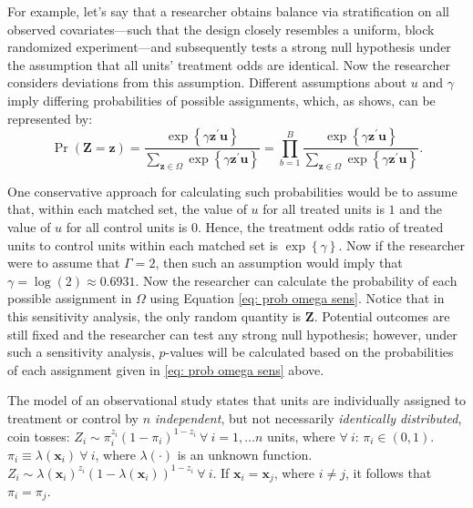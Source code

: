 \documentclass[12pt,leqno]{article}
\theoremstyle{newstyle}
\begin{document}
For example, let's say that a researcher obtains balance via stratification on all observed covariates---such that the design closely resembles a uniform, block randomized experiment---and subsequently tests a strong null hypothesis under the assumption that all units' treatment odds are identical. Now the researcher considers deviations from this assumption. Different assumptions about $u$ and $\gamma$ imply differing probabilities of possible assignments, which, as \citet[Chapter 4]{rosenbaum2002observational} shows, can be represented by:
\begin{equation}
\Pr\left(\mathbf{Z} = \mathbf{z}\right) = \frac{\exp\left\{\gamma \mathbf{z}^{\prime}\mathbf{u}\right\}}{\sum_{\mathbf{z} \in \Omega} \exp\left\{\gamma \mathbf{z}^{\prime}\mathbf{u}\right\}} = \prod \limits_{b = 1}^B \frac{\exp\left\{\gamma \mathbf{z}^{\prime}\mathbf{u}\right\}}{\sum_{\mathbf{z} \in \Omega} \exp\left\{\gamma \mathbf{z}^{\prime}\mathbf{u}\right\}}.
\label{eq: prob omega sens}
\end{equation}

One conservative approach for calculating such probabilities would be to assume that, within each matched set, the value of $u$ for all treated units is $1$ and the value of $u$ for all control units is $0$. Hence, the treatment odds ratio of treated units to control units within each matched set is $\exp\left\{\gamma\right\}$. Now if the researcher were to assume that $\Gamma = 2$, then such an assumption would imply that $\gamma = \log\left(2\right) \approx 0.6931$. Now the researcher can calculate the probability of each possible assignment in $\Omega$ using Equation \ref{eq: prob omega sens}. Notice that in this sensitivity analysis, the only random quantity is $\mathbf{Z}$. Potential outcomes are still fixed and the researcher can test any strong null hypothesis; however, under such a sensitivity analysis, $p$-values will be calculated based on the probabilities of each assignment given in \eqref{eq: prob omega sens} above.


The model of an observational study states that units are individually assigned to treatment or control by $n$ \textit{independent}, but not necessarily \textit{identically distributed}, coin tosses: $Z_i \sim \pi_i^{z_i} \left(1 - \pi_i\right)^{1 - z_i} \ \forall \ i = 1, \dots n$ units, where $\forall \ i$: $\pi_i \in (0, 1)$.
$\pi_i \equiv \lambda\left(\mathbf{x}_i\right) \ \forall \ i$, where $\lambda\left(\cdot\right)$ is an unknown function.
$Z_i \sim \lambda\left(\mathbf{x}_i\right)^{z_i} \left(1 - \lambda\left(\mathbf{x}_i\right)\right)^{1 - z_i} \ \forall \ i$.
If $\mathbf{x}_i = \mathbf{x}_j$, where $i \neq j$, it follows that $\pi_i = \pi_j$.

\pagebreak
\begin{singlespace}

\end{singlespace}
\end{document}
